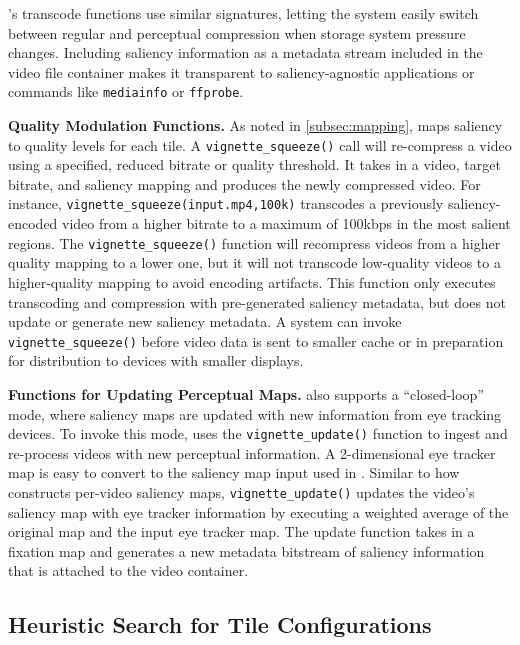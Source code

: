 \nameStore's transcode functions use similar signatures, letting the system easily switch between regular and perceptual compression when storage system pressure changes.
Including saliency information as a metadata stream included in the video file container makes it transparent to saliency-agnostic applications or commands like \texttt{mediainfo} or \texttt{ffprobe}.

\noindent\textbf{Quality Modulation Functions.}
As noted in \ref{subsec:mapping}, \nameCompress maps saliency to quality levels for each tile.
A \texttt{vignette\_squeeze()} call will re-compress a video using a specified, reduced bitrate or quality threshold.
It takes in a video, target bitrate, and saliency mapping and produces the newly compressed video.
For instance, \texttt{vignette\_squeeze(input.mp4,100k)} transcodes a previously saliency-encoded video from a higher bitrate to a maximum of 100kbps in the most salient regions.
The \texttt{vignette\_squeeze()} function will recompress videos from a higher quality mapping to a lower one, but it will not transcode low-quality videos to a higher-quality mapping to avoid encoding artifacts.
This function only executes transcoding and compression with pre-generated saliency metadata, but does not update or generate new saliency metadata.
A system can invoke \texttt{vignette\_squeeze()} before video data is sent to smaller cache or in preparation for distribution to devices with smaller displays.

\noindent\textbf{Functions for Updating Perceptual Maps.}
\nameStore also supports a ``closed-loop'' mode, where saliency maps are updated with new information from eye tracking devices.
To invoke this mode, \nameStore uses the \texttt{vignette\_update()} function to ingest and re-process videos with new perceptual information.
A 2-dimensional eye tracker map is easy to convert to the saliency map input used in \nameCompress.
Similar to how \name constructs per-video saliency maps, \texttt{vignette\_update()} updates the video's saliency map with eye tracker information by executing a weighted average of the original map and the input eye tracker map.
The update function takes in a fixation map and generates a new metadata bitstream of saliency information that is attached to the video container.

\subsection{Heuristic Search for Tile Configurations}
\label{subsec:search-algo}

